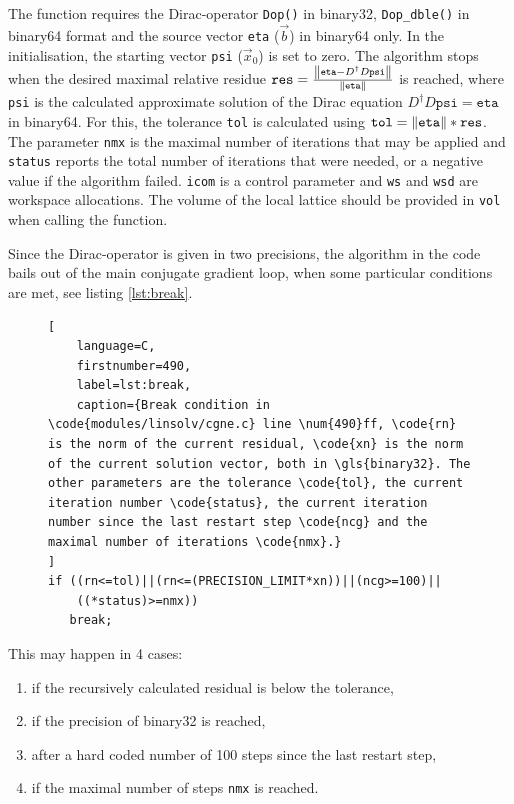 \documentclass{article}
\theoremstyle{plain} %
\theoremstyle{convention} %
\theoremstyle{remark} %
\def\code#1{\texttt{#1}}
\numberwithin{equation}{section}
\begin{document}
The function requires the Dirac-operator \code{Dop()} in \gls{binary32}, \code{Dop\_dble()} in \gls{binary64} format and the source vector \code{eta} ($\vec{b}$) in \gls{binary64} only. In the initialisation, the starting vector \code{psi} ($\vec{x}_0$) is set to zero. The algorithm stops when the desired maximal relative residue $\code{res} =\frac{\norm{\code{eta}-D^\dagger D \code{psi}}}{\norm{\code{eta}}}$ is reached, where \code{psi} is the calculated approximate solution of the Dirac equation $D^\dagger D \code{psi}=\code{eta}$ in \gls{binary64}. For this, the tolerance \code{tol} is calculated using $\code{tol} = \norm{\code{eta}} * \code{res}$. The parameter \code{nmx} is the maximal number of iterations that may be applied and \code{status} reports the total number of iterations that were needed, or a negative value if the algorithm failed. \code{icom} is a control parameter and \code{ws} and \code{wsd} are workspace allocations. The volume of the local lattice should be provided in \code{vol} when calling the function.

Since the Dirac-operator is given in two precisions, the algorithm in the code bails out of the main conjugate gradient loop, when some particular conditions are met, see listing \ref{lst:break}.

\begin{figure} %
\begin{lstlisting}[
    language=C,
    firstnumber=490,
    label=lst:break,
    caption={Break condition in \code{modules/linsolv/cgne.c} line \num{490}ff, \code{rn} is the norm of the current residual, \code{xn} is the norm of the current solution vector, both in \gls{binary32}. The other parameters are the tolerance \code{tol}, the current iteration number \code{status}, the current iteration number since the last restart step \code{ncg} and the maximal number of iterations \code{nmx}.}
]
if ((rn<=tol)||(rn<=(PRECISION_LIMIT*xn))||(ncg>=100)||
    ((*status)>=nmx))
   break;
\end{lstlisting}
\end{figure} 

This may happen in 4 cases:

\begin{enumerate}
  \item if the recursively calculated residual is below the tolerance,
  \item if the precision of \gls{binary32} is reached\footnotemark,
  \item after a hard coded number of \num{100} steps since the last restart step,
  \item if the maximal number of steps \code{nmx} is reached.
\end{enumerate}
\end{document}
